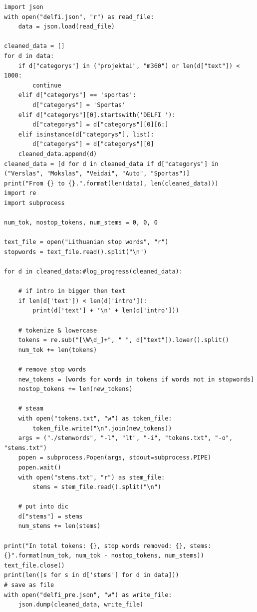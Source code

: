 \documentclass{VUMIFInfKursinis}
\begin{document}
\begin{lstlisting}[caption=Analizės kodas]
import json
with open("delfi.json", "r") as read_file:
    data = json.load(read_file)
 
cleaned_data = []
for d in data:
    if d["categorys"] in ("projektai", "m360") or len(d["text"]) < 1000:
        continue
    elif d["categorys"] == 'sportas':
        d["categorys"] = 'Sportas'
    elif d["categorys"][0].startswith('DELFI '):
        d["categorys"] = d["categorys"][0][6:]
    elif isinstance(d["categorys"], list):
        d["categorys"] = d["categorys"][0]
    cleaned_data.append(d)
cleaned_data = [d for d in cleaned_data if d["categorys"] in ("Verslas", "Mokslas", "Veidai", "Auto", "Sportas")]
print("From {} to {}.".format(len(data), len(cleaned_data)))
import re
import subprocess
 
num_tok, nostop_tokens, num_stems = 0, 0, 0
 
text_file = open("Lithuanian stop words", "r")
stopwords = text_file.read().split("\n")
 
for d in cleaned_data:#log_progress(cleaned_data):
 
    # if intro in bigger then text
    if len(d['text']) < len(d['intro']):
        print(d['text'] + '\n' + len(d['intro']))
 
    # tokenize & lowercase
    tokens = re.sub("[\W\d_]+", " ", d["text"]).lower().split()
    num_tok += len(tokens)
 
    # remove stop words
    new_tokens = [words for words in tokens if words not in stopwords]
    nostop_tokens += len(new_tokens)
 
    # steam
    with open("tokens.txt", "w") as token_file:
        token_file.write("\n".join(new_tokens))
    args = ("./stemwords", "-l", "lt", "-i", "tokens.txt", "-o", "stems.txt")
    popen = subprocess.Popen(args, stdout=subprocess.PIPE)
    popen.wait()
    with open("stems.txt", "r") as stem_file:
        stems = stem_file.read().split("\n")
 
    # put into dic
    d["stems"] = stems
    num_stems += len(stems)
 
print("In total tokens: {}, stop words removed: {}, stems: {}".format(num_tok, num_tok - nostop_tokens, num_stems))
text_file.close()
print(len([s for s in d['stems'] for d in data]))
# save as file
with open("delfi_pre.json", "w") as write_file:
    json.dump(cleaned_data, write_file)


\end{lstlisting}
\end{document}
